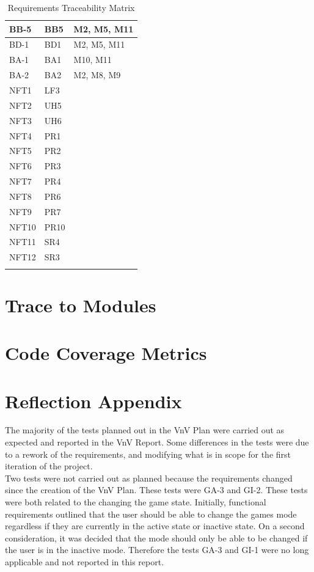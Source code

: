 \documentclass[12pt, titlepage]{article}
\begin{document}
\begin{longtable}{| p{} | p{} | p{}|}
  \hline
  BB-5 & BB5 & M2, M5, M11\\
  \hline
  BD-1 & BD1 &  M2, M5, M11\\
  \hline
  BA-1 & BA1 & M10, M11\\
  \hline
  BA-2 & BA2 & M2, M8, M9\\
  \hline
  NFT1 & LF3 &\\
  \hline
  NFT2 & UH5 &\\
  \hline
  NFT3 & UH6 &\\
  \hline
  NFT4 & PR1 &\\
  \hline
  NFT5 & PR2 &\\
  \hline
  NFT6 & PR3 &\\
  \hline
  NFT7 & PR4 &\\
  \hline
  NFT8 & PR6 &\\
  \hline
  NFT9 & PR7 &\\
  \hline
  NFT10 & PR10 &\\
  \hline
  NFT11 & SR4 &\\
  \hline
  NFT12 & SR3 &\\
  \hline
\caption{Requirements Traceability Matrix}
\end{longtable}
		
\section{Trace to Modules}		

\section{Code Coverage Metrics}

\appendix
\section{Reflection Appendix}
The majority of the tests planned out in the VnV Plan were carried out as expected and reported in the VnV Report. 
Some differences in the tests were due to a rework of the requirements, and modifying what is in scope for the first iteration of the project.\\

Two tests were not carried out as planned because the requirements changed since the creation of the VnV Plan. These tests were GA-3 and GI-2.
These tests were both related to the changing the game state. Initially, functional requirements outlined that the user should be able to change the games mode
regardless if they are currently in the active state or inactive state. On a second consideration, it was decided that the mode should only be able to be changed if
the user is in the inactive mode. Therefore the tests GA-3 and GI-1 were no long applicable and not reported in this report. \\
\end{document}
